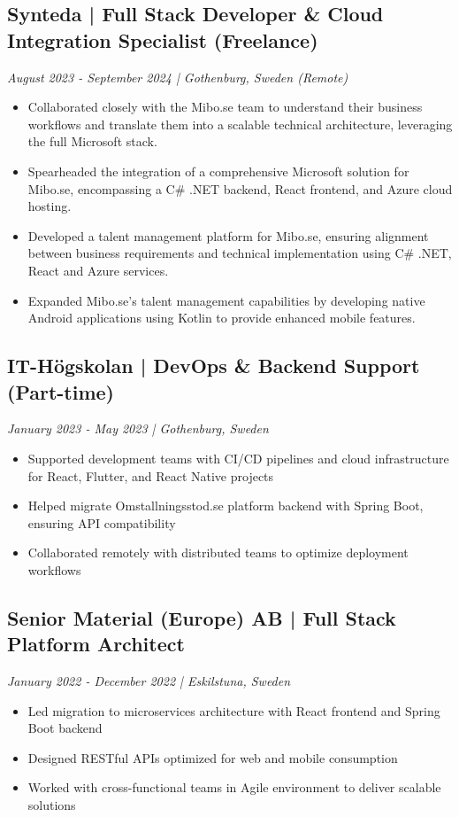 \documentclass[11pt,a4paper]{article}
\begin{document}
\subsection*{Synteda | Full Stack Developer \& Cloud Integration Specialist (Freelance)}
\textit{August 2023 - September 2024 | Gothenburg, Sweden (Remote)}
\begin{itemize}[noitemsep]
\item Collaborated closely with the Mibo.se team to understand their business workflows and translate them into a scalable technical architecture, leveraging the full Microsoft stack.
\item Spearheaded the integration of a comprehensive Microsoft solution for Mibo.se, encompassing a C# .NET backend, React frontend, and Azure cloud hosting.
\item Developed a talent management platform for Mibo.se, ensuring alignment between business requirements and technical implementation using C# .NET, React and Azure services.
\item Expanded Mibo.se's talent management capabilities by developing native Android applications using Kotlin to provide enhanced mobile features.
\end{itemize}

\subsection*{IT-Högskolan | DevOps \& Backend Support (Part-time)}
\textit{January 2023 - May 2023 | Gothenburg, Sweden}
\begin{itemize}[noitemsep]
\item Supported development teams with CI/CD pipelines and cloud infrastructure for React, Flutter, and React Native projects
\item Helped migrate Omstallningsstod.se platform backend with Spring Boot, ensuring API compatibility
\item Collaborated remotely with distributed teams to optimize deployment workflows
\end{itemize}

\subsection*{Senior Material (Europe) AB | Full Stack Platform Architect}
\textit{January 2022 - December 2022 | Eskilstuna, Sweden}
\begin{itemize}[noitemsep]
\item Led migration to microservices architecture with React frontend and Spring Boot backend
\item Designed RESTful APIs optimized for web and mobile consumption
\item Worked with cross-functional teams in Agile environment to deliver scalable solutions
\end{itemize}
\end{document}
